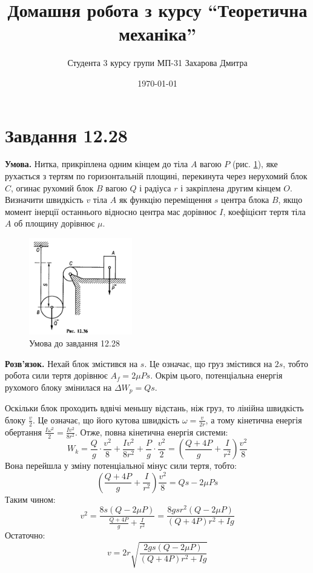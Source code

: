 \documentclass[14pt]{extarticle}
\title{Домашня робота з курсу ``Теоретична механіка''}
\author{Студента 3 курсу групи МП-31 Захарова Дмитра}
\date{\today}
\begin{document}
\maketitle

\section*{Завдання 12.28}

\textbf{Умова.} Нитка, прикріплена одним кінцем до тіла $A$ вагою $P$ (рис. \ref{fig:1}), яке рухається з тертям по горизонтальній площині, перекинута через нерухомий блок $C$, огинає рухомий блок $B$ вагою $Q$ і радіуса $r$ і закріплена другим кінцем $O$. Визначити швидкість $v$ тіла $A$ як функцію переміщення $s$ центра блока $B$, якщо момент інерції останнього відносно центра мас дорівнює $I$, коефіцієнт тертя тіла $A$ об площину дорівнює $\mu$.

\begin{figure}[H]
    \centering
    \includegraphics[width=0.4\textwidth]{images/hw_11/12-28.png}
    \caption{Умова до завдання 12.28}
    \label{fig:1}
\end{figure}

\textbf{Розв'язок.} Нехай блок змістився на $s$. Це означає, що груз змістився на $2s$, тобто робота сили тертя дорівнює $A_f=2\mu Ps$. Окрім цього, потенціальна енергія рухомого блоку змінилася на $\Delta W_p = Qs$.

Оскільки блок проходить вдвічі меньшу відстань, ніж груз, то лінійна швидкість блоку $\frac{v}{2}$. Це означає, що його кутова швидкість $\omega=\frac{v}{2r}$, а тому кінетична енергія обертання $\frac{I\omega^2}{2} = \frac{Iv^2}{8r^2}$. Отже, повна кінетична енергія системи:
\[
W_k = \frac{Q}{g} \cdot \frac{v^2}{8} + \frac{Iv^2}{8r^2} + \frac{P}{g} \cdot \frac{v^2}{2} = \left(\frac{Q+4P}{g} + \frac{I}{r^2}\right)\frac{v^2}{8}
\]
Вона перейшла у зміну потенціальної мінус сили тертя, тобто:
\[
\left(\frac{Q+4P}{g} + \frac{I}{r^2}\right)\frac{v^2}{8} = Qs - 2\mu P s
\]
Таким чином:
\[
v^2 = \frac{8s(Q-2\mu P)}{\frac{Q+4P}{g}+\frac{I}{r^2}} = \frac{8gsr^2(Q-2\mu P)}{(Q+4P)r^2 + Ig}
\]
Остаточно:
\[
\boxed{v = 2r\sqrt{\frac{2gs(Q-2\mu P)}{(Q+4P)r^2+Ig}}}
\]
\end{document}
